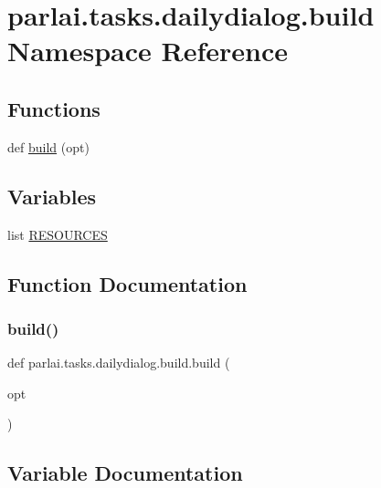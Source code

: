 \hypertarget{namespaceparlai_1_1tasks_1_1dailydialog_1_1build}{}\section{parlai.\+tasks.\+dailydialog.\+build Namespace Reference}
\label{namespaceparlai_1_1tasks_1_1dailydialog_1_1build}
\subsection*{Functions}
\begin{DoxyCompactItemize}
\item 
def \hyperlink{namespaceparlai_1_1tasks_1_1dailydialog_1_1build_a04bbf27e3a854b42e42d2b6b3c4707a0}{build} (opt)
\end{DoxyCompactItemize}
\subsection*{Variables}
\begin{DoxyCompactItemize}
\item 
list \hyperlink{namespaceparlai_1_1tasks_1_1dailydialog_1_1build_ac23bf3be98da838ec5957c457a66c2e6}{R\+E\+S\+O\+U\+R\+C\+ES}
\end{DoxyCompactItemize}


\subsection{Function Documentation}
\mbox{\label{namespaceparlai_1_1tasks_1_1dailydialog_1_1build_a04bbf27e3a854b42e42d2b6b3c4707a0}} 
\subsubsection{\texorpdfstring{build()}{build()}}
{\footnotesize\ttfamily def parlai.\+tasks.\+dailydialog.\+build.\+build (\begin{DoxyParamCaption}\item[{}]{opt }\end{DoxyParamCaption})}



\subsection{Variable Documentation}
\mbox{\label{namespaceparlai_1_1tasks_1_1dailydialog_1_1build_ac23bf3be98da838ec5957c457a66c2e6}} 
